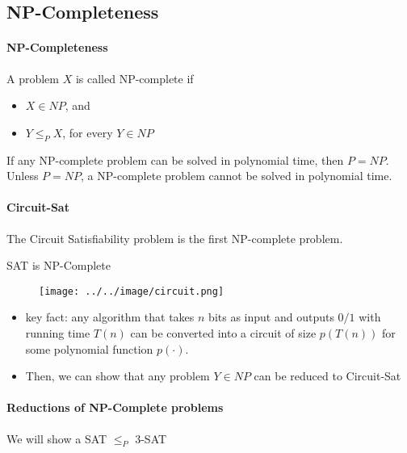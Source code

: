             \subsection{NP-Completeness}
                \paragraph{NP-Completeness}
                    A problem $X$ is called NP-complete if
                    \begin{itemize}
                        \item $X \in NP$, and
                        \item $Y \le_P X$, for every $Y \in NP$
                    \end{itemize}

                    If any NP-complete problem can be solved in polynomial time, then $P = NP$. Unless $P = NP$, a NP-complete problem cannot be solved in polynomial time.

                \paragraph{Circuit-Sat}
                    The Circuit Satisfiability problem is the first NP-complete problem.

                    \begin{theorem}
                        SAT is NP-Complete
                    \end{theorem}

                    \begin{figure}[H]
                        \centering
                        \texttt{[image: ../../image/circuit.png]}
                    \end{figure}

                    \begin{itemize}
                        \item key fact: any algorithm that takes $n$ bits as input and outputs $0/1$ with running time $T(n)$ can be converted into a circuit of size $p(T(n))$ for some polynomial function $p(\cdot)$.
                        \item Then, we can show that any problem $Y \in NP$ can be reduced to Circuit-Sat
                    \end{itemize}

                \paragraph{Reductions of NP-Complete problems}
                    We will show a SAT $\le_P$ 3-SAT

